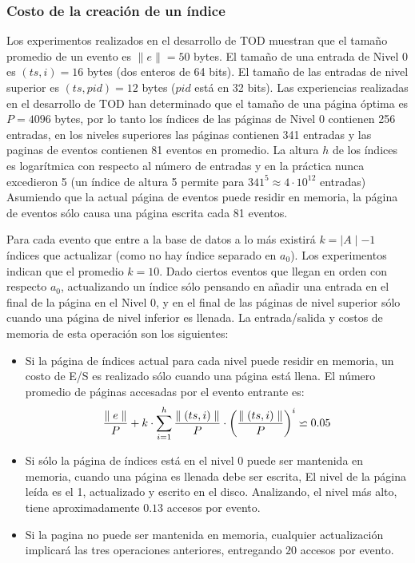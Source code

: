 \documentclass[12pt,legalpaper]{report}
\begin{document}
			\subsubsection{Costo de la creación de un índice}

Los experimentos realizados en el desarrollo de TOD muestran que el tamaño promedio de un evento es $\parallel e \parallel= 50$ bytes.  El tamaño de una entrada de Nivel 0 es $(ts,i) = 16$ bytes (dos enteros de 64 bits).  El tamaño de las entradas de nivel superior es $(ts,pid) = 12$ bytes ($pid$ está en 32 bits).  Las experiencias realizadas en el desarrollo de TOD han determinado que el tamaño de una página óptima es $P = 4096$ bytes, por lo tanto los índices de las páginas de Nivel 0 contienen 256 entradas, en los niveles superiores las páginas contienen 341 entradas y las paginas de eventos contienen 81 eventos en promedio.  La altura $h$ de los índices es logarítmica con respecto al número de entradas y en la práctica nunca excedieron 5 (un índice de altura 5 permite para $341^{5} \approx 4\cdot10^{12}$ entradas)  Asumiendo que la actual página de eventos puede residir en memoria, la página de eventos sólo causa una página escrita cada 81 eventos.

Para cada evento que entre a la base de datos a lo más existirá $k = \mid A\mid-1$ índices que actualizar (como no hay índice separado en $a_{0}$).  Los experimentos indican que el promedio $k = 10$.  Dado ciertos eventos que llegan en orden con respecto $a_{0}$, actualizando un índice sólo pensando en añadir una entrada en el final de la página en el Nivel 0, y en el final de las páginas de nivel superior sólo cuando una página de nivel inferior es llenada.  La entrada/salida y costos de memoria de esta operación son los siguientes:

\begin{itemize}
	\item Si la página de índices actual para cada nivel puede residir en memoria, un costo de E/S es realizado sólo cuando una página está llena.  El número promedio de páginas accesadas por el evento entrante es:
		\begin{displaymath}
{\parallel e \parallel \over P} + k \cdot \sum_{i=1}^{h}{\parallel(ts,i)\parallel \over P}\cdot \left({\parallel(ts,i)\parallel \over P}\right)^i\backsimeq 0.05
		\end{displaymath}

	\item Si sólo la página de índices está en el nivel 0 puede ser mantenida en memoria, cuando una página es llenada debe ser escrita, El nivel de la página leída es el 1, actualizado y escrito en el disco.  Analizando, el nivel más alto, tiene aproximadamente $0.13$ accesos por evento.  

	\item Si la pagina no puede ser mantenida en memoria, cualquier actualización implicará las tres operaciones anteriores, entregando $20$ accesos por evento.
\end{itemize}
\end{document}
